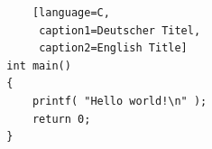 \documentclass[a4paper]{article}
\begin{document}
\lstlistoflistings    %
\listoflstlistingEng  %

\clearpage

\begin{lstlisting}
      [language=C,
       caption1=Deutscher Titel,
       caption2=English Title]
  int main()
  {
      printf( "Hello world!\n" );
      return 0;
  }
\end{lstlisting}
\end{document}
